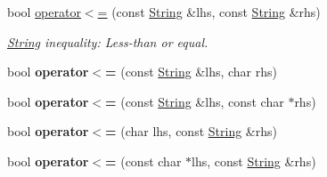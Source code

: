 {\bf }\par
\begin{DoxyCompactItemize}
\item 
bool \hyperlink{classString_a48545cc6c63142caa4dcce85a1b6feda}{operator$<$=} (const \hyperlink{classString}{String} \&lhs, const \hyperlink{classString}{String} \&rhs)
\begin{DoxyCompactList}\small\item\em \hyperlink{classString}{String} inequality\-: Less-\/than or equal. \end{DoxyCompactList}\item 
\hypertarget{classString_aecee2dfb26d23435db896bda83fb452f}{bool {\bfseries operator$<$=} (const \hyperlink{classString}{String} \&lhs, char rhs)}\label{classString_aecee2dfb26d23435db896bda83fb452f}

\item 
\hypertarget{classString_a990a88794f4e1678fd932c84de435e26}{bool {\bfseries operator$<$=} (const \hyperlink{classString}{String} \&lhs, const char $\ast$rhs)}\label{classString_a990a88794f4e1678fd932c84de435e26}

\item 
\hypertarget{classString_ae0f56c55308c60b51d3a0d255b65eb0e}{bool {\bfseries operator$<$=} (char lhs, const \hyperlink{classString}{String} \&rhs)}\label{classString_ae0f56c55308c60b51d3a0d255b65eb0e}

\item 
\hypertarget{classString_a8849265e14282c47ef7327ce79e14d0e}{bool {\bfseries operator$<$=} (const char $\ast$lhs, const \hyperlink{classString}{String} \&rhs)}\label{classString_a8849265e14282c47ef7327ce79e14d0e}

\end{DoxyCompactItemize}

